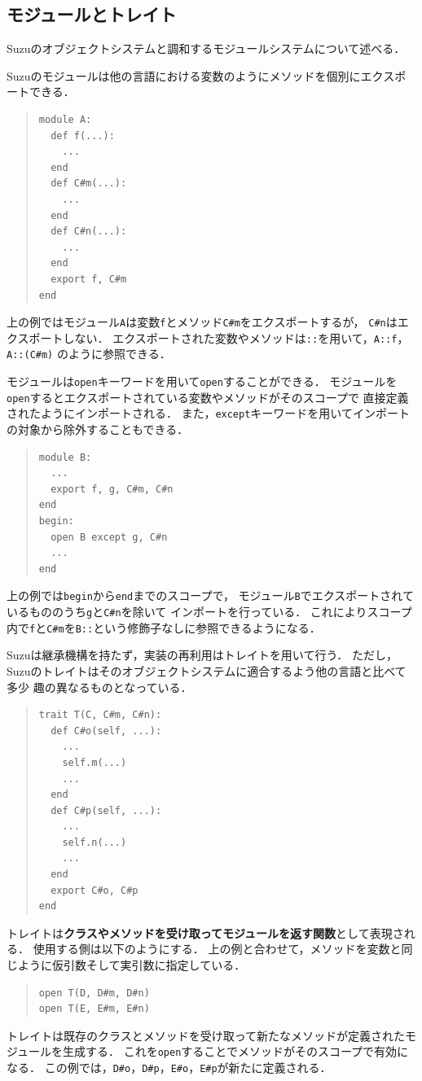 \documentclass{ipsjprosym}
\begin{document}
\subsection{モジュールとトレイト}

Suzuのオブジェクトシステムと調和するモジュールシステムについて述べる．

Suzuのモジュールは他の言語における変数のようにメソッドを個別にエクスポートできる．
\begin{quote}
\begin{verbatim}
module A:
  def f(...):
    ...
  end
  def C#m(...):
    ...
  end
  def C#n(...):
    ...
  end
  export f, C#m
end
\end{verbatim}
\end{quote}
上の例ではモジュール\verb|A|は変数\verb|f|とメソッド\verb|C#m|をエクスポートするが，
\verb|C#n|はエクスポートしない．
エクスポートされた変数やメソッドは\verb|::|を用いて，\verb|A::f|，\verb|A::(C#m)|
のように参照できる．

モジュールは\verb|open|キーワードを用いて\verb|open|することができる．
モジュールを\verb|open|するとエクスポートされている変数やメソッドがそのスコープで
直接定義されたようにインポートされる．
また，\verb|except|キーワードを用いてインポートの対象から除外することもできる．
\begin{quote}
\begin{verbatim}
module B:
  ...
  export f, g, C#m, C#n
end
begin:
  open B except g, C#n
  ...
end
\end{verbatim}
\end{quote}
上の例では\verb|begin|から\verb|end|までのスコープで，
モジュール\verb|B|でエクスポートされているもののうち\verb|g|と\verb|C#n|を除いて
インポートを行っている．
これによりスコープ内で\verb|f|と\verb|C#m|を\verb|B::|という修飾子なしに参照できるようになる．

Suzuは継承機構を持たず，実装の再利用はトレイト\cite{Scharli:2003}を用いて行う．
ただし，Suzuのトレイトはそのオブジェクトシステムに適合するよう他の言語と比べて多少
趣の異なるものとなっている．
\begin{quote}
\begin{verbatim}
trait T(C, C#m, C#n):
  def C#o(self, ...):
    ...
    self.m(...)
    ...
  end
  def C#p(self, ...):
    ...
    self.n(...)
    ...
  end
  export C#o, C#p
end
\end{verbatim}
\end{quote}
トレイトは\textbf{クラスやメソッドを受け取ってモジュールを返す関数}として表現される．
使用する側は以下のようにする．
上の例と合わせて，メソッドを変数と同じように仮引数そして実引数に指定している．
\begin{quote}
\begin{verbatim}
open T(D, D#m, D#n)
open T(E, E#m, E#n)
\end{verbatim}
\end{quote}
トレイトは既存のクラスとメソッドを受け取って新たなメソッドが定義されたモジュールを生成する．
これを\verb|open|することでメソッドがそのスコープで有効になる．
この例では，\verb|D#o|，\verb|D#p|，\verb|E#o|，\verb|E#p|が新たに定義される．
\end{document}
